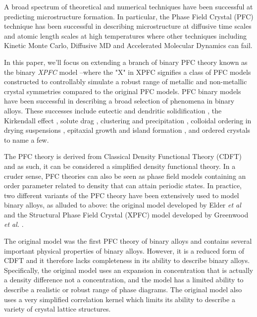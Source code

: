 \documentclass[showkeys, prb, reprint]{revtex4-1}
\begin{document}
A broad spectrum of theoretical and numerical techniques have been successful
at predicting microstructure formation. In particular, the Phase Field Crystal
(PFC) technique has been successful in describing microstructure at diffusive time 
scales and atomic length scales at high temperatures where other
techniques including Kinetic Monte Carlo, Diffusive MD and Accelerated
Molecular Dynamics can fail.


In this paper, we'll focus on extending a branch of binary PFC theory known as
the binary {\it XPFC} model --where the "X" in XPFC signifies a class of PFC
models  constructed to controllably simulate a robust range of metallic and
non-metallic crystal symmetries compared to the original PFC models. PFC binary models have been successful in describing a broad selection of phenomena in binary alloys.  These successes include eutectic and dendritic solidification
\cite{ELDER07}, the Kirkendall effect \cite{ELDER11_KIRKENDALL, LU15}, solute
drag \cite{GREENWOOD12}, clustering and precipitation \cite{FALLAH12, FALLAH13,
FALLAH13_AlCu_experiment}, colloidal ordering in drying suspensions
\cite{GANAI13}, epitaxial growth and island formation \cite{ELDER10_NANOISLAND,
LU16}, and ordered crystals \cite{SEYMOUR16,ALSTER17} to name a few. 

The PFC theory is derived from Classical Density Functional Theory (CDFT) and
as such, it can be considered a simplified density functional theory. In a cruder sense, PFC theories can also be seen as phase field models containing an order parameter related to density  that can attain periodic states. In practice, two different variants of the PFC theory have been extensively used to model binary alloys, as alluded to above: the original model developed by Elder \textit{et al} \cite{ELDER07} and the Structural Phase Field Crystal (XPFC) model developed by Greenwood \textit{et al.} \cite{GREENWOOD11_BINARY}.

The original model was the first PFC theory of binary alloys and contains several
important physical properties of binary alloys. However, it is a  reduced
form of CDFT and it therefore lacks completeness in its ability to describe
binary alloys. Specifically, the original model uses an expansion in
concentration that is actually a density difference not a concentration, and
the model has a limited ability to describe a realistic or robust range of
phase diagrams. The original model also uses a very simplified correlation
kernel which limits its ability to describe a variety of crystal lattice
structures.
\end{document}
